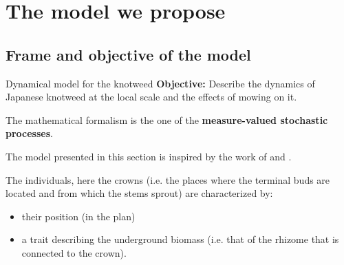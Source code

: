 \documentclass{myBeamer}
\newcommand{\R}{\mathbb R}%
\newcommand{\Mcal}{\mathcal{M}}%
\newcommand{\Pcal}{\mathcal P}%
\begin{document}
\section*{The model we propose}
\subsection*{Frame and objective of the model}
\begin{frame}{Dynamical model for the knotweed}
\textbf{Objective:} Describe the dynamics of Japanese knotweed at the local scale and the effects of mowing on it.

\smallbreak
The mathematical formalism is the one of the \textbf{measure-valued stochastic processes}.

\smallbreak
The model presented in this section is inspired by the work of \cite{fournier2004microscopic} and \cite{tran2006modeles}.

\smallbreak
 The individuals, here the crowns 
 (i.e. the places where the terminal buds are located and from which the stems sprout) are characterized by:
 \begin{itemize}
\item  their position (in the plan)
 \item  a trait describing the underground biomass (i.e. that of the rhizome that is connected to the crown).
\end{itemize}
 
\end{frame}






%
%
\end{document}
